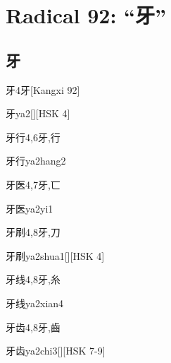 \section*{Radical 92: ``⽛''}

\subsection*{牙}

\begin{Entry}{牙}{4}{⽛}[Kangxi 92]
  \begin{Phonetics}{牙}{ya2}[][HSK 4]
  \end{Phonetics}
\end{Entry}

\begin{Entry}{牙行}{4,6}{⽛,⾏}
  \begin{Phonetics}{牙行}{ya2hang2}
  \end{Phonetics}
\end{Entry}

\begin{Entry}{牙医}{4,7}{⽛,⼖}
  \begin{Phonetics}{牙医}{ya2yi1}
  \end{Phonetics}
\end{Entry}

\begin{Entry}{牙刷}{4,8}{⽛,⼑}
  \begin{Phonetics}{牙刷}{ya2shua1}[][HSK 4]
  \end{Phonetics}
\end{Entry}

\begin{Entry}{牙线}{4,8}{⽛,⽷}
  \begin{Phonetics}{牙线}{ya2xian4}
  \end{Phonetics}
\end{Entry}

\begin{Entry}{牙齿}{4,8}{⽛,⿒}
  \begin{Phonetics}{牙齿}{ya2chi3}[][HSK 7-9]
  \end{Phonetics}
\end{Entry}

